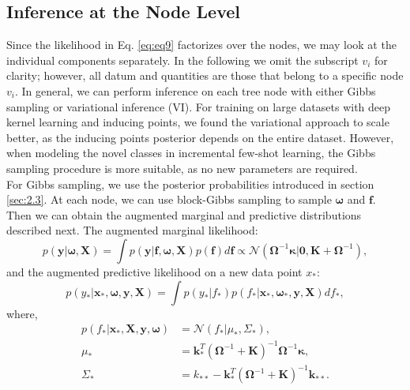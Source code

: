 \documentclass[preprint,11pt]{elsarticle}
\begin{document}
        \subsection{Inference at the Node Level}
        \label{sec:3.2}
            Since the likelihood in Eq. \ref{eq:eq9} factorizes over the nodes, we
        may look at the individual components separately. In the
        following we omit the subscript $v_i$ for clarity; however, all
        datum and quantities are those that belong to a specific node
        $v_i$. In general, we can perform inference on each tree node
        with either Gibbs sampling or variational inference (VI).
        For training on large datasets with deep kernel learning and
        inducing points, we found the variational approach to scale
        better, as the inducing points posterior depends on the entire
        dataset. However, when modeling the novel classes in incremental
        few-shot learning, the Gibbs sampling procedure is
        more suitable, as no new parameters are required.
        \\
        For Gibbs sampling, we use the posterior probabilities introduced
        in section \ref{sec:2.3}. At each node, we can use block-Gibbs
        sampling to sample $\bm{\omega}$ and $\bm{f}$. Then we can obtain the augmented
        marginal and predictive distributions described next.
        The augmented marginal likelihood:
        \begin{equation}
            \label{eq:eq10}
            p( \bm{y}|\bm{\omega},\bm{X} ) = \int p( \bm{y}|\bm{f},\bm{\omega},\bm{X} )p(\bm{f})d\bm{f} \propto \mathcal{N} ( \bm{\Omega}^{-1} \bm{\kappa} | \textbf{0}, \bm{K}+\bm{\Omega}^{-1}),
        \end{equation}
        and the augmented predictive likelihood on a new data point
        $x_*$:
        \begin{equation}
        \label{eq:eq11}
            p( y_*|\bm{x}_*,\bm{\omega},\bm{y},\bm{X}  ) = \int p( y_*|f_*)p( f_*|\bm{x}_*,\bm{\omega}_*,\bm{y},\bm{X} )df_*,
        \end{equation}
        where,
        \begin{align}
        \label{eq:eq12}
            p( f_*|\bm{x}_*,\bm{X},\bm{y},\bm{\omega}  ) &= \mathcal{N}( f_*|\mu_*,\Sigma_* ),\nonumber \\
            \mu_* &= \bm{k}_*^T( \bm{\Omega}^{-1}+\bm{K} )^{-1}\bm{\Omega}^{-1}\bm{\kappa},\\
            \Sigma_* &= k_{**} - \bm{k}_*^T( \bm{\Omega}^{-1}+\bm{K} )^{-1} \bm{k}_{**}.\nonumber
        \end{align}
\end{document}
